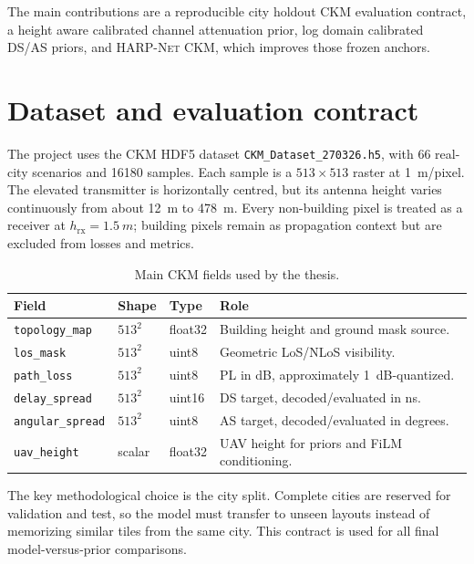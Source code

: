 The main contributions are a reproducible city holdout CKM evaluation contract,
a height aware calibrated channel attenuation prior, log domain calibrated DS/AS priors,
and \textsc{HARP-Net CKM}, which improves those frozen anchors.

\section{Dataset and evaluation contract}

The project uses the CKM HDF5 dataset \texttt{CKM\_Dataset\_270326.h5}, with 66
real-city scenarios and 16180 samples. Each sample is a \(513\times513\) raster
at \SI{1}{m}/pixel. The elevated transmitter is horizontally centred, but its
antenna height varies continuously from about \SI{12}{m} to \SI{478}{m}. Every
non-building pixel is treated as a receiver at \(h_{\mathrm{rx}}=\SI{1.5}{m}\);
building pixels remain as propagation context but are excluded from losses and
metrics.

\begin{table}[htbp]
\centering
\caption{Main CKM fields used by the thesis.}
\label{tab:dataset_fields_intro}
\scriptsize
\begin{tabularx}{\textwidth}{lllX}
\toprule
Field & Shape & Type & Role \\
\midrule
\texttt{topology\_map} & \(513^2\) & float32 & Building height and ground mask source. \\
\texttt{los\_mask} & \(513^2\) & uint8 & Geometric LoS/NLoS visibility. \\
\texttt{path\_loss} & \(513^2\) & uint8 & PL in dB, approximately \SI{1}{dB}-quantized. \\
\texttt{delay\_spread} & \(513^2\) & uint16 & DS target, decoded/evaluated in ns. \\
\texttt{angular\_spread} & \(513^2\) & uint8 & AS target, decoded/evaluated in degrees. \\
\texttt{uav\_height} & scalar & float32 & UAV height for priors and FiLM conditioning. \\
\bottomrule
\end{tabularx}
\end{table}

The key methodological choice is the city split. Complete cities are reserved
for validation and test, so the model must transfer to unseen layouts instead of
memorizing similar tiles from the same city. This contract is used for all final
model-versus-prior comparisons.


